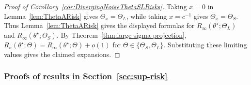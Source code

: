 \documentclass[11pt]{article}
\theoremstyle{plain}
\theoremstyle{definition}
\begin{document}
\begin{proof}[Proof of Corollary~\ref{cor:DivergingNoiseThetaSLRisks}]    
    Taking $x=0$ in Lemma~\ref{lem:ThetaARisk} gives $\Theta_x=\Theta_L$, while taking $x=c^{-1}$ gives $\Theta_x=\Theta_S$. Thus Lemma~\ref{lem:ThetaARisk} gives the displayed formulas for $R_\infty(\theta^\star;\Theta_L)$ and $R_\infty(\theta^\star;\Theta_S)$. By Theorem~\ref{thm:large-sigma-projection}, $R_\sigma(\theta^\star;\Theta)
    =
    R_\infty(\theta^\star;\Theta)+o(1)$ for $\Theta \in \{ \Theta_S, \Theta_L\}$. Substituting these limiting values gives the claimed expansions.
\end{proof}




\subsubsection{Proofs of results in Section~\ref{sec:sup-risk}}
\end{document}
